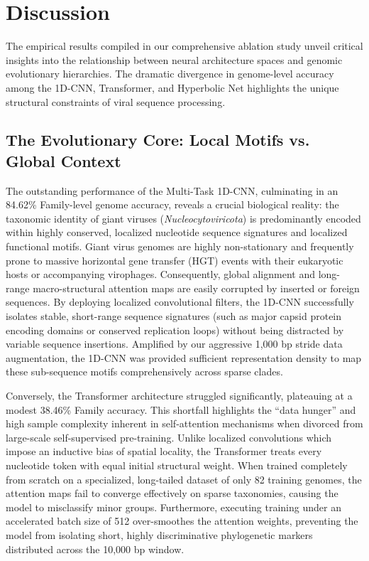 \documentclass[11pt,a4paper]{article}
\begin{document}
\section{Discussion}
The empirical results compiled in our comprehensive ablation study unveil critical insights into the relationship between neural architecture spaces and genomic evolutionary hierarchies. The dramatic divergence in genome-level accuracy among the 1D-CNN, Transformer, and Hyperbolic Net highlights the unique structural constraints of viral sequence processing.

\subsection{The Evolutionary Core: Local Motifs vs. Global Context}
The outstanding performance of the Multi-Task 1D-CNN, culminating in an 84.62\% Family-level genome accuracy, reveals a crucial biological reality: the taxonomic identity of giant viruses (\textit{Nucleocytoviricota}) is predominantly encoded within highly conserved, localized nucleotide sequence signatures and localized functional motifs. Giant virus genomes are highly non-stationary and frequently prone to massive horizontal gene transfer (HGT) events with their eukaryotic hosts or accompanying virophages. Consequently, global alignment and long-range macro-structural attention maps are easily corrupted by inserted or foreign sequences. By deploying localized convolutional filters, the 1D-CNN successfully isolates stable, short-range sequence signatures (such as major capsid protein encoding domains or conserved replication loops) without being distracted by variable sequence insertions. Amplified by our aggressive 1,000 bp stride data augmentation, the 1D-CNN was provided sufficient representation density to map these sub-sequence motifs comprehensively across sparse clades.

Conversely, the Transformer architecture struggled significantly, plateauing at a modest 38.46\% Family accuracy. This shortfall highlights the ``data hunger'' and high sample complexity inherent in self-attention mechanisms when divorced from large-scale self-supervised pre-training. Unlike localized convolutions which impose an inductive bias of spatial locality, the Transformer treats every nucleotide token with equal initial structural weight. When trained completely from scratch on a specialized, long-tailed dataset of only 82 training genomes, the attention maps fail to converge effectively on sparse taxonomies, causing the model to misclassify minor groups. Furthermore, executing training under an accelerated batch size of 512 over-smoothes the attention weights, preventing the model from isolating short, highly discriminative phylogenetic markers distributed across the 10,000 bp window.
\end{document}
